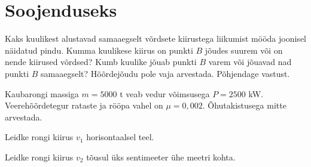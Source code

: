 \documentclass[a4paper,11pt,twocolumn]{article}
\begin{document}
\section{Soojenduseks}
\begin{question}[Piirk 2018, P3][dun7][3.5cm]
	Kaks kuulikest alustavad samaaegselt võrdsete kiirustega liikumist mööda joonisel näidatud pindu. Kumma kuulikese kiirus on punkti $ B $ jõudes suurem või on nende kiirused võrdsed? Kumb kuulike jõuab punkti $ B $ varem või jõuavad nad punkti $ B $ samaaegselt? Hõõrdejõudu pole vaja arvestada. Põhjendage vastust.
\end{question}
\begin{question}[Lahtine 2014, N4]
	Kaubarongi massiga $ m = 5000 $ t veab vedur võimsusega $ P = 2500 $ kW. Veerehõõrdetegur rataste ja rööpa vahel on $ \mu = 0,002 $. Õhutakistusega mitte arvestada.
	\begin{subquestion}
		\item Leidke rongi kiirus $ v_1 $ horisontaalsel teel.
		\item Leidke rongi kiirus $ v_2 $ tõusul üks sentimeeter ühe meetri kohta.
	\end{subquestion}
\end{question}
\end{document}
